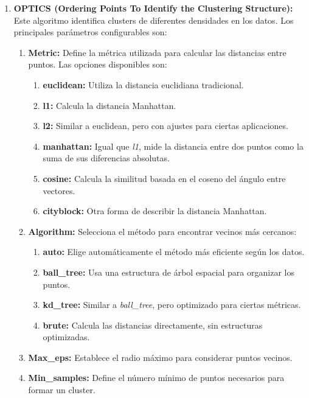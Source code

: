 \begin{enumerate}
    \item \textbf{OPTICS (Ordering Points To Identify the Clustering Structure):}
    Este algoritmo identifica clusters de diferentes densidades en los datos. Los principales parámetros configurables son:
    \begin{enumerate}
        \item \textbf{Metric:} Define la métrica utilizada para calcular las distancias entre puntos. Las opciones disponibles son:
        \begin{enumerate}
            \item \textbf{euclidean:} Utiliza la distancia euclidiana tradicional.
            \item \textbf{l1:} Calcula la distancia Manhattan.
            \item \textbf{l2:} Similar a euclidean, pero con ajustes para ciertas aplicaciones.
            \item \textbf{manhattan:} Igual que \textit{l1}, mide la distancia entre dos puntos como la suma de sus diferencias absolutas.
            \item \textbf{cosine:} Calcula la similitud basada en el coseno del ángulo entre vectores.
            \item \textbf{cityblock:} Otra forma de describir la distancia Manhattan.
        \end{enumerate}
        \item \textbf{Algorithm:} Selecciona el método para encontrar vecinos más cercanos:
        \begin{enumerate}
            \item \textbf{auto:} Elige automáticamente el método más eficiente según los datos.
            \item \textbf{ball\_tree:} Usa una estructura de árbol espacial para organizar los puntos.
            \item \textbf{kd\_tree:} Similar a \textit{ball\_tree}, pero optimizado para ciertas métricas.
            \item \textbf{brute:} Calcula las distancias directamente, sin estructuras optimizadas.
        \end{enumerate}
        \item \textbf{Max\_eps:} Establece el radio máximo para considerar puntos vecinos.
        \item \textbf{Min\_samples:} Define el número mínimo de puntos necesarios para formar un cluster.
    \end{enumerate}
    

\end{enumerate}

